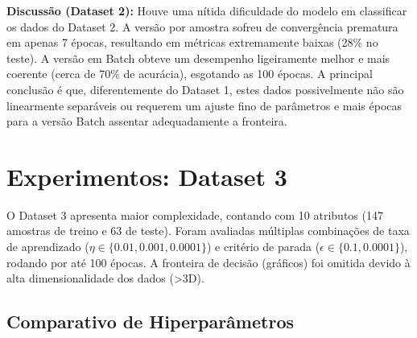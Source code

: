\documentclass[12pt,a4paper]{article}
\begin{document}
\textbf{Discussão (Dataset 2):} Houve uma nítida dificuldade do modelo em classificar os dados do Dataset 2. A versão por amostra sofreu de convergência prematura em apenas 7 épocas, resultando em métricas extremamente baixas (28\% no teste). A versão em Batch obteve um desempenho ligeiramente melhor e mais coerente (cerca de 70\% de acurácia), esgotando as 100 épocas. A principal conclusão é que, diferentemente do Dataset 1, estes dados possivelmente não são linearmente separáveis ou requerem um ajuste fino de parâmetros e mais épocas para a versão Batch assentar adequadamente a fronteira.


\section{Experimentos: Dataset 3}
O Dataset 3 apresenta maior complexidade, contando com 10 atributos (147 amostras de treino e 63 de teste). Foram avaliadas múltiplas combinações de taxa de aprendizado ($\eta \in \{0.01, 0.001, 0.0001\}$) e critério de parada ($\epsilon \in \{0.1, 0.0001\}$), rodando por até 100 épocas. A fronteira de decisão (gráficos) foi omitida devido à alta dimensionalidade dos dados (>3D).

\subsection{Comparativo de Hiperparâmetros}
\begin{table}[H]
\centering
{}
\caption{Amostra (Am) vs Batch (Ba) no Dataset 3}
\end{table}
\end{document}
